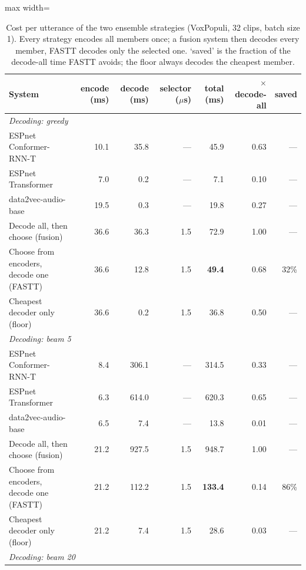 \begin{table}[t]
    \centering
    \caption{Cost per utterance of the two ensemble strategies (VoxPopuli, 32 clips, batch size 1). Every strategy encodes all members once; a fusion system then decodes every member, FASTT decodes only the selected one. `saved' is the fraction of the decode-all time FASTT avoids; the floor always decodes the cheapest member.}
    \label{tab:systems_voxpopuli} \footnotesize \setlength{\tabcolsep}{3pt}
    \begin{adjustbox}{max width=\linewidth}
    \begin{tabular}{lrrrrrr}
        \toprule
        \textbf{System} & \textbf{encode (ms)} & \textbf{decode (ms)} & \textbf{selector ($\mu$s)} & \textbf{total (ms)} & \textbf{$\times$ decode-all} & \textbf{saved} \\
        \midrule
        \multicolumn{7}{l}{\textit{Decoding: greedy}} \\
        \quad ESPnet Conformer-RNN-T & 10.1 & 35.8 & --- & 45.9 & 0.63 & --- \\
        \quad ESPnet Transformer & 7.0 & 0.2 & --- & 7.1 & 0.10 & --- \\
        \quad data2vec-audio-base & 19.5 & 0.3 & --- & 19.8 & 0.27 & --- \\
        Decode all, then choose (fusion) & 36.6 & 36.3 & 1.5 & 72.9 & 1.00 & --- \\
        Choose from encoders, decode one (FASTT) & 36.6 & 12.8 & 1.5 & \textbf{49.4} & 0.68 & 32\% \\
        Cheapest decoder only (floor) & 36.6 & 0.2 & 1.5 & 36.8 & 0.50 & --- \\
        \midrule \multicolumn{7}{l}{\textit{Decoding: beam 5}} \\
        \quad ESPnet Conformer-RNN-T & 8.4 & 306.1 & --- & 314.5 & 0.33 & --- \\
        \quad ESPnet Transformer & 6.3 & 614.0 & --- & 620.3 & 0.65 & --- \\
        \quad data2vec-audio-base & 6.5 & 7.4 & --- & 13.8 & 0.01 & --- \\
        Decode all, then choose (fusion) & 21.2 & 927.5 & 1.5 & 948.7 & 1.00 & --- \\
        Choose from encoders, decode one (FASTT) & 21.2 & 112.2 & 1.5 & \textbf{133.4} & 0.14 & 86\% \\
        Cheapest decoder only (floor) & 21.2 & 7.4 & 1.5 & 28.6 & 0.03 & --- \\
        \midrule \multicolumn{7}{l}{\textit{Decoding: beam 20}} \\

\end{tabular}
\end{adjustbox}
\end{table}
